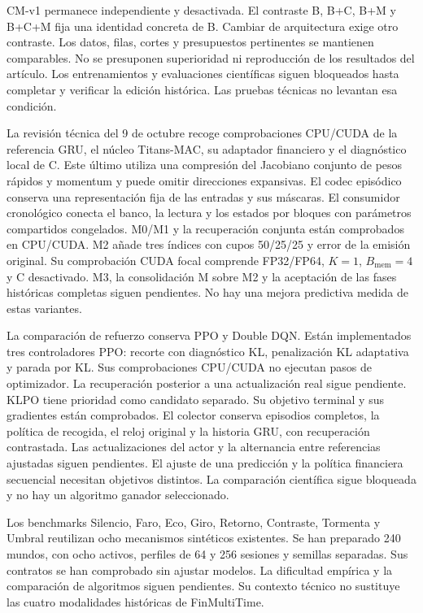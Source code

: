\documentclass[11pt,a4paper]{report}
\begin{document}
CM-v1 permanece independiente y desactivada. El contraste B, B+C, B+M y B+C+M
fija una identidad concreta de B. Cambiar de arquitectura exige otro contraste.
Los datos, filas, cortes y presupuestos pertinentes se mantienen comparables.
No se presuponen superioridad ni reproducción de los resultados del artículo.
Los entrenamientos y evaluaciones científicas siguen bloqueados hasta completar
y verificar la edición histórica. Las pruebas técnicas no levantan esa condición.

La revisión técnica del 9 de octubre recoge comprobaciones CPU/CUDA de la referencia GRU,
el núcleo Titans-MAC, su adaptador financiero y el diagnóstico local de C.
Este último utiliza una compresión del Jacobiano conjunto de pesos rápidos
y momentum y puede omitir direcciones expansivas. El codec episódico conserva
una representación fija de las entradas y sus máscaras. El consumidor
cronológico conecta el banco, la lectura y los estados por bloques con
parámetros compartidos congelados. M0/M1 y la recuperación conjunta están
comprobados en CPU/CUDA. M2 añade tres índices con cupos 50/25/25 y error de la
emisión original. Su comprobación CUDA focal comprende FP32/FP64, $K=1$,
$B_{\mathrm{mem}}=4$ y C desactivado. M3, la consolidación M sobre M2 y la
aceptación de las fases históricas completas siguen pendientes. No hay una
mejora predictiva medida de estas variantes.

La comparación de refuerzo conserva PPO y Double DQN. Están implementados tres
controladores PPO: recorte con diagnóstico KL, penalización KL adaptativa y
parada por KL. Sus comprobaciones CPU/CUDA no ejecutan pasos de optimizador.
La recuperación posterior a una actualización real sigue pendiente. KLPO tiene
prioridad como candidato separado. Su objetivo terminal y sus gradientes están
comprobados. El colector conserva episodios completos, la política de recogida,
el reloj original y la historia GRU, con recuperación contrastada. Las
actualizaciones del actor y la alternancia entre referencias ajustadas siguen pendientes.
El ajuste de una predicción y la política financiera secuencial necesitan
objetivos distintos. La comparación científica sigue bloqueada y no hay un
algoritmo ganador seleccionado.

Los benchmarks Silencio, Faro, Eco, Giro, Retorno, Contraste, Tormenta y Umbral
reutilizan ocho mecanismos sintéticos existentes. Se han preparado 240 mundos,
con ocho activos, perfiles de 64 y 256 sesiones y semillas separadas. Sus contratos
se han comprobado sin ajustar modelos. La dificultad empírica y la comparación
de algoritmos siguen pendientes. Su contexto técnico no sustituye las cuatro
modalidades históricas de FinMultiTime.
\end{document}
